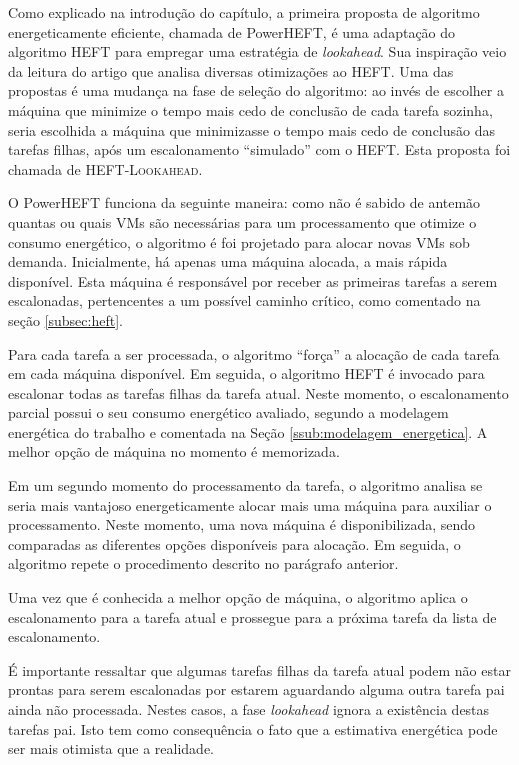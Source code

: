 Como explicado na introdução do capítulo, a primeira proposta de algoritmo
energeticamente eficiente, chamada de PowerHEFT, é uma adaptação do algoritmo
HEFT para empregar uma estratégia de \emph{lookahead}. Sua inspiração veio da
leitura do artigo \cite{bittencourt:heft_lookahead} que analisa diversas
otimizações ao HEFT. Uma das propostas é uma mudança na fase de seleção do
algoritmo: ao invés de escolher a máquina que minimize o tempo mais cedo de
conclusão de cada tarefa sozinha, seria escolhida a máquina que minimizasse o
tempo mais cedo de conclusão das tarefas filhas, após um escalonamento
``simulado'' com o HEFT. Esta proposta foi chamada de \textsc{HEFT-Lookahead}.

O PowerHEFT funciona da seguinte maneira: como não é sabido de antemão quantas
ou quais VMs são necessárias para um processamento que otimize o consumo
energético, o algoritmo é foi projetado para alocar novas VMs sob demanda.
Inicialmente, há apenas uma máquina alocada, a mais rápida disponível. Esta
máquina é responsável por receber as primeiras tarefas a serem escalonadas,
pertencentes a um possível caminho crítico, como comentado na seção
\ref{subsec:heft}.

Para cada tarefa a ser processada, o algoritmo ``força'' a alocação de cada
tarefa em cada máquina disponível. Em seguida, o algoritmo HEFT é invocado para
escalonar todas as tarefas filhas da tarefa atual. Neste momento, o
escalonamento parcial possui o seu consumo energético avaliado, segundo a
modelagem energética do trabalho \cite{guerout:energy_aware_simulation} e
comentada na Seção \ref{ssub:modelagem_energetica}. A melhor opção de máquina no
momento é memorizada.

Em um segundo momento do processamento da tarefa, o algoritmo analisa se seria
mais vantajoso energeticamente alocar mais uma máquina para auxiliar o
processamento. Neste momento, uma nova máquina é disponibilizada, sendo
comparadas as diferentes opções disponíveis para alocação. Em seguida, o
algoritmo repete o procedimento descrito no parágrafo anterior.

Uma vez que é conhecida a melhor opção de máquina, o algoritmo aplica o
escalonamento para a tarefa atual e prossegue para a próxima tarefa da lista de
escalonamento.

É importante ressaltar que algumas tarefas filhas da tarefa atual podem não
estar prontas para serem escalonadas por estarem aguardando alguma outra
tarefa pai ainda não processada. Nestes casos, a fase \emph{lookahead} ignora
a existência destas tarefas pai. Isto tem como consequência o fato que a
estimativa energética pode ser mais otimista que a realidade.

